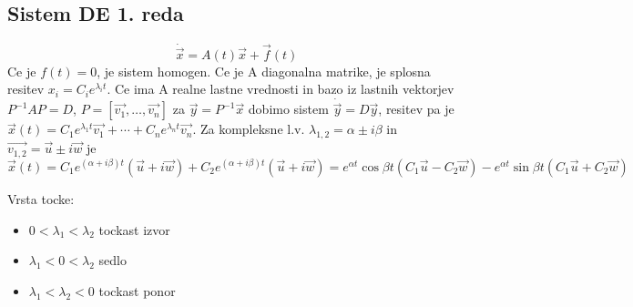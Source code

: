 \documentclass[a4paper,11pt]{article}
\begin{document}
\subsection{Sistem DE 1. reda}
\[\dot{\vec{x}} = A(t)\vec{x}+\vec{f}(t)\]
Ce je \(f(t) = 0\), je sistem homogen. Ce je A diagonalna matrike, je splosna resitev \(x_i = C_i e^{\lambda _i t}\). Ce ima A realne lastne vrednosti in bazo iz lastnih vektorjev \(P^{-1}AP = D\), \(P = [\vec{v_1},\ldots,\vec{v_n}]\) za \(\vec{y} = P^{-1}\vec{x}\) dobimo sistem \(\dot{\vec{y}} = D\vec{y}\), resitev pa je \(\vec{x}(t) = C_1 e^{\lambda _1 t}\vec{v_1} + \cdots + C_n e^{\lambda _n t}\vec{v_n} \).
Za kompleksne l.v. \(\lambda _{1,2} = \alpha \pm i\beta\) in \(\vec{v_{1,2}} = \vec{u} \pm i\vec{w}\) je \(\vec{x}(t) = C_1 e^{(\alpha + i\beta)t}(\vec{u} + i\vec{w}) +  C_2 e^{(\alpha + i\beta)t}(\vec{u} + i\vec{w})  = e^{\alpha t} \cos{\beta t}(C_1 \vec{u} - C_2 \vec{w}) - e^{\alpha t} \sin{\beta t}(C_1 \vec{u} + C_2 \vec{w})\)

Vrsta tocke:
\begin{itemize}
	\item \(0<\lambda _1 < \lambda _2\) tockast izvor
	\item \(\lambda _1 < 0 < \lambda _2\) sedlo
	\item \(\lambda _1 < \lambda _2 < 0\) tockast ponor
\end{itemize}
\end{document}
